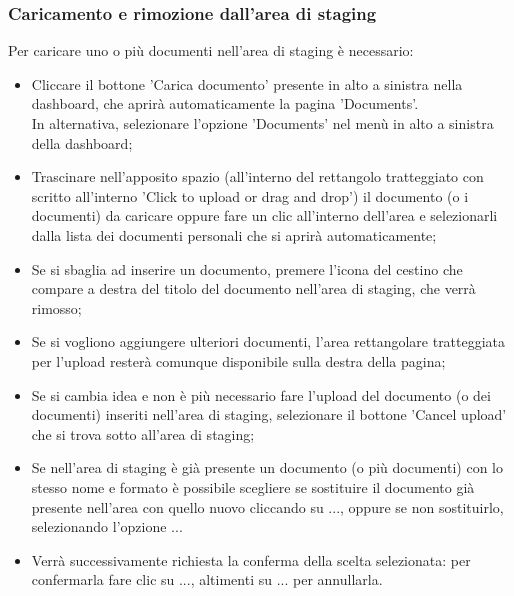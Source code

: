 \documentclass[10pt, a4paper]{article}
\begin{document}
\subsubsection{Caricamento e rimozione dall'area di staging}
Per caricare uno o più documenti nell'area di staging è necessario:
\begin{itemize}
    \item Cliccare il bottone 'Carica documento' presente in alto a sinistra nella dashboard, che aprirà automaticamente la pagina 'Documents'.\\
    In alternativa, selezionare l'opzione 'Documents' nel menù in alto a sinistra della dashboard;
    \item Trascinare nell'apposito spazio (all'interno del rettangolo tratteggiato con scritto all'interno 'Click to upload or drag and drop') il documento (o i documenti) da caricare oppure fare un clic all'interno dell'area e selezionarli dalla lista dei documenti personali che si aprirà automaticamente;
    \item Se si sbaglia ad inserire un documento, premere l'icona del cestino che compare a destra del titolo del documento nell'area di staging, che verrà rimosso;
    \item Se si vogliono aggiungere ulteriori documenti, l'area rettangolare tratteggiata per l'upload resterà comunque disponibile sulla destra della pagina;
    \item Se si cambia idea e non è più necessario fare l'upload del documento (o dei documenti) inseriti nell'area di staging, selezionare il bottone 'Cancel upload' che si trova sotto all'area di staging;
    \item Se nell'area di staging è già presente un documento (o più documenti) con lo stesso nome e formato è possibile scegliere se sostituire il documento già presente nell'area con quello nuovo cliccando su ..., oppure se non sostituirlo, selezionando l'opzione ... 
    \item  Verrà successivamente richiesta la conferma della scelta selezionata: per confermarla fare clic su ..., altimenti su ... per annullarla.
    \end{itemize} 
\end{document}
